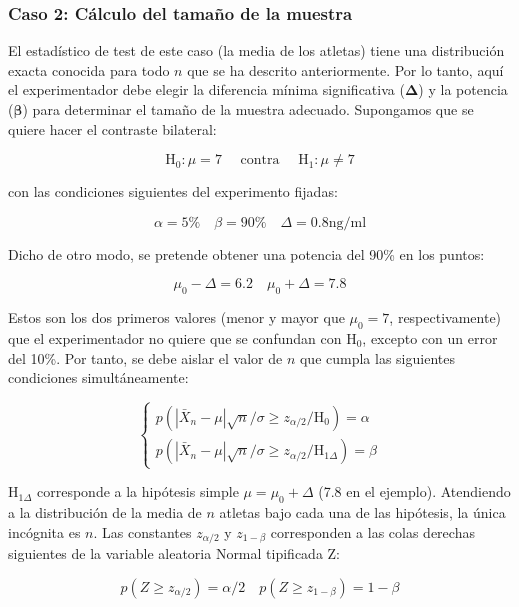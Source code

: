 \documentclass[
]{article}
\begin{document}
\subsubsection{Caso 2: Cálculo del tamaño de la muestra}\label{caso-2-cuxe1lculo-del-tamauxf1o-de-la-muestra}

El estadístico de test de este caso (la media de los atletas) tiene una distribución exacta conocida para todo \(n\) que se ha descrito anteriormente. Por lo tanto, aquí el experimentador debe elegir la diferencia mínima significativa (\(\boldsymbol{\Delta}\)) y la potencia (\(\boldsymbol{\beta}\)) para determinar el tamaño de la muestra adecuado. Supongamos que se quiere hacer el contraste bilateral:

\[
\mathrm{H}_{0}: \mu=7 \quad \text { contra } \quad \mathrm{H}_{1}: \mu \neq 7
\]

con las condiciones siguientes del experimento fijadas:

\[
\alpha=5 \% \quad \beta=90 \% \quad \Delta=0.8 \mathrm{ng} / \mathrm{ml}
\]

Dicho de otro modo, se pretende obtener una potencia del 90\% en los puntos:

\[
\mu_{0}-\Delta=6.2 \quad \mu_{0}+\Delta=7.8
\]

Estos son los dos primeros valores (menor y mayor que \(\mu_{0}=7\), respectivamente) que el experimentador no quiere que se confundan con \(\mathrm{H}_{0}\), excepto con un error del 10\%. Por tanto, se debe aislar el valor de \(n\) que cumpla las siguientes condiciones simultáneamente:

\[
\left\{\begin{array}{l}
p\left(\left|\bar{X}_{n}-\mu\right| \sqrt{n} / \sigma \geq z_{\alpha / 2} / \mathrm{H}_{0}\right)=\alpha \\
p\left(\left|\bar{X}_{n}-\mu\right| \sqrt{n} / \sigma \geq z_{\alpha / 2} / \mathrm{H}_{1 \Delta}\right)=\beta
\end{array}\right.
\]

\(\mathrm{H}_{1 \Delta}\) corresponde a la hipótesis simple \(\mu=\mu_{0}+\Delta\) (7.8 en el ejemplo). Atendiendo a la distribución de la media de \(n\) atletas bajo cada una de las hipótesis, la única incógnita es \(n\). Las constantes \(z_{\alpha / 2}\) y \(z_{1-\beta}\) corresponden a las colas derechas siguientes de la variable aleatoria Normal tipificada Z:

\[
p\left(Z \geq z_{\alpha / 2}\right)=\alpha / 2 \quad p\left(Z \geq z_{1-\beta}\right)=1-\beta
\]
\end{document}
